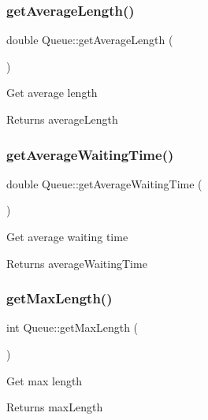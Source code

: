 \subsubsection{\texorpdfstring{get\+Average\+Length()}{getAverageLength()}}
{\footnotesize\ttfamily double Queue\+::get\+Average\+Length (\begin{DoxyParamCaption}{ }\end{DoxyParamCaption})}

Get average length \begin{DoxyReturn}{Returns}
average\+Length 
\end{DoxyReturn}
\mbox{\label{classQueue_a21c1c1c4732177f6b8d8433ae5b4d771}} 
\subsubsection{\texorpdfstring{get\+Average\+Waiting\+Time()}{getAverageWaitingTime()}}
{\footnotesize\ttfamily double Queue\+::get\+Average\+Waiting\+Time (\begin{DoxyParamCaption}{ }\end{DoxyParamCaption})}

Get average waiting time \begin{DoxyReturn}{Returns}
average\+Waiting\+Time 
\end{DoxyReturn}
\mbox{\label{classQueue_ac52fd0970c24510a4d0d3086b027021a}} 
\subsubsection{\texorpdfstring{get\+Max\+Length()}{getMaxLength()}}
{\footnotesize\ttfamily int Queue\+::get\+Max\+Length (\begin{DoxyParamCaption}{ }\end{DoxyParamCaption})}

Get max length \begin{DoxyReturn}{Returns}
max\+Length 
\end{DoxyReturn}
\mbox{\label{classQueue_a65d9b23c23c917faa44981539bc34be7}} 
